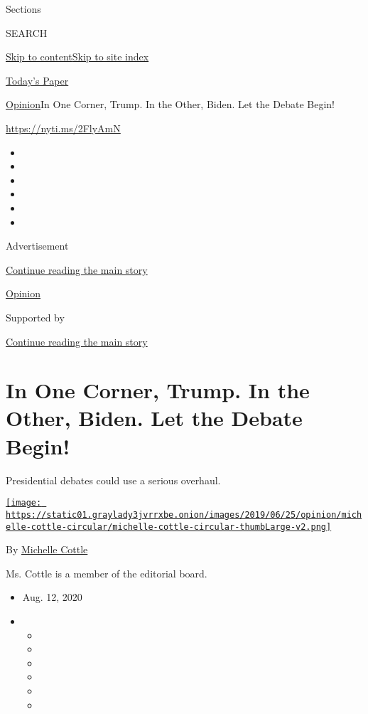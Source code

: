 Sections

SEARCH

\protect\hyperlink{site-content}{Skip to
content}\protect\hyperlink{site-index}{Skip to site index}

\href{https://myaccount.nytimes3xbfgragh.onion/auth/login?response_type=cookie\&client_id=vi}{}

\href{https://www.nytimes3xbfgragh.onion/section/todayspaper}{Today's
Paper}

\href{/section/opinion}{Opinion}\textbar{}In One Corner, Trump. In the
Other, Biden. Let the Debate Begin!

\url{https://nyti.ms/2FlyAmN}

\begin{itemize}
\item
\item
\item
\item
\item
\item
\end{itemize}

Advertisement

\protect\hyperlink{after-top}{Continue reading the main story}

\href{/section/opinion}{Opinion}

Supported by

\protect\hyperlink{after-sponsor}{Continue reading the main story}

\hypertarget{in-one-corner-trump-in-the-other-biden-let-the-debate-begin}{%
\section{In One Corner, Trump. In the Other, Biden. Let the Debate
Begin!}\label{in-one-corner-trump-in-the-other-biden-let-the-debate-begin}}

Presidential debates could use a serious overhaul.

\href{https://www.nytimes3xbfgragh.onion/by/michelle-cottle}{\texttt{[image: https://static01.graylady3jvrrxbe.onion/images/2019/06/25/opinion/michelle-cottle-circular/michelle-cottle-circular-thumbLarge-v2.png]}}

By \href{https://www.nytimes3xbfgragh.onion/by/michelle-cottle}{Michelle
Cottle}

Ms. Cottle is a member of the editorial board.

\begin{itemize}
\item
  Aug. 12, 2020
\item
  \begin{itemize}
  \item
  \item
  \item
  \item
  \item
  \item
  \end{itemize}
\end{itemize}


